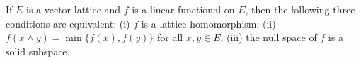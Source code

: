 If $E$ is a vector lattice and $f$ is a linear functional on $E$, then the following three conditions are equivalent: (i) $f$ is a lattice homomorphism; (ii) $f(x \land y) = \min \{f(x), f(y)\}$ for all $x, y \in E$; (iii) the null space of $f$ is a solid subspace.
